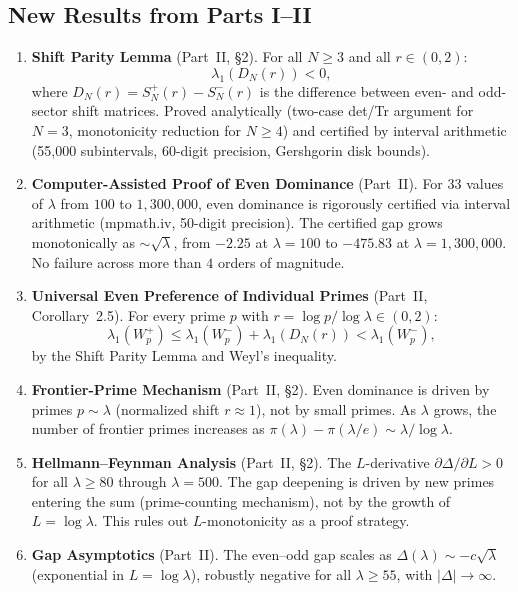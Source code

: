 \documentclass[12pt,a4paper]{article}
\theoremstyle{definition}
\theoremstyle{remark}
\begin{document}
\subsection{New Results from Parts I--II}

\begin{enumerate}[label=\textbf{N\arabic*},leftmargin=3em]
  \item \textbf{Shift Parity Lemma} (Part~II, \S2). For all $N \geq 3$ and all $r \in (0,2)$:
  \[ \lambda_1(D_N(r)) < 0, \]
  where $D_N(r) = S_N^+(r) - S_N^-(r)$ is the difference between even- and odd-sector shift matrices. Proved analytically (two-case det/Tr argument for $N=3$, monotonicity reduction for $N \geq 4$) and certified by interval arithmetic (55,000 subintervals, 60-digit precision, Gershgorin disk bounds).

  \item \textbf{Computer-Assisted Proof of Even Dominance} (Part~II). For $33$ values of $\lambda$ from $100$ to $1{,}300{,}000$, even dominance is rigorously certified via interval arithmetic (mpmath.iv, 50-digit precision). The certified gap grows monotonically as $\sim\!\sqrt{\lambda}$, from $-2.25$ at $\lambda = 100$ to $-475.83$ at $\lambda = 1{,}300{,}000$. No failure across more than $4$ orders of magnitude.

  \item \textbf{Universal Even Preference of Individual Primes} (Part~II, Corollary~2.5). For every prime $p$ with $r = \log p / \log\lambda \in (0,2)$:
  \[ \lambda_1(W_p^+) \leq \lambda_1(W_p^-) + \lambda_1(D_N(r)) < \lambda_1(W_p^-), \]
  by the Shift Parity Lemma and Weyl's inequality.

  \item \textbf{Frontier-Prime Mechanism} (Part~II, \S2). Even dominance is driven by primes $p \sim \lambda$ (normalized shift $r \approx 1$), not by small primes. As $\lambda$ grows, the number of frontier primes increases as $\pi(\lambda) - \pi(\lambda/e) \sim \lambda/\log\lambda$.

  \item \textbf{Hellmann--Feynman Analysis} (Part~II, \S2). The $L$-derivative $\partial\Delta/\partial L > 0$ for all $\lambda \geq 80$ through $\lambda = 500$. The gap deepening is driven by new primes entering the sum (prime-counting mechanism), not by the growth of $L = \log\lambda$. This rules out $L$-monotonicity as a proof strategy.

  \item \textbf{Gap Asymptotics} (Part~II). The even--odd gap scales as $\Delta(\lambda) \sim -c\sqrt{\lambda}$ (exponential in $L = \log\lambda$), robustly negative for all $\lambda \geq 55$, with $|\Delta| \to \infty$.


\end{enumerate}
\end{document}
